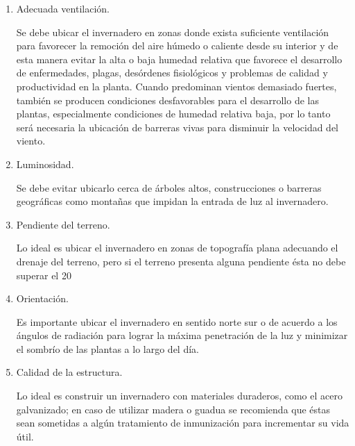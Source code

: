 \begin{enumerate}
    \item Adecuada ventilación. 
    
        Se debe ubicar el invernadero en zonas donde exista suficiente
        ventilación para favorecer la remoción del aire húmedo o caliente desde
        su interior y de esta manera evitar la alta o baja humedad relativa que
        favorece el desarrollo de enfermedades, plagas, desórdenes fisiológicos
        y problemas de calidad y productividad en la planta. Cuando predominan
        vientos demasiado fuertes, también se producen condiciones
        desfavorables para el desarrollo de las plantas, especialmente
        condiciones de humedad relativa baja, por lo tanto será necesaria la
        ubicación de barreras vivas para disminuir la velocidad del viento.
    \item Luminosidad. 

        Se debe evitar ubicarlo cerca de árboles altos, construcciones o
        barreras geográficas como montañas que impidan la entrada de luz al
        invernadero.
    \item Pendiente del terreno. 

        Lo ideal es ubicar el invernadero en zonas de topografía plana
        adecuando el drenaje del terreno, pero si el terreno presenta alguna
        pendiente ésta no debe superar el 20%
    \item Orientación. 

        Es importante ubicar el invernadero en sentido norte sur o de acuerdo a
        los ángulos de radiación para lograr la máxima penetración de la luz y
        minimizar el sombrío de las plantas a lo largo del día.
    \item Calidad de la estructura. 

        Lo ideal es construir un invernadero con materiales duraderos, como el
        acero galvanizado; en caso de utilizar madera o guadua se recomienda
        que éstas sean sometidas a algún tratamiento de inmunización para
        incrementar su vida útil.

\end{enumerate}

